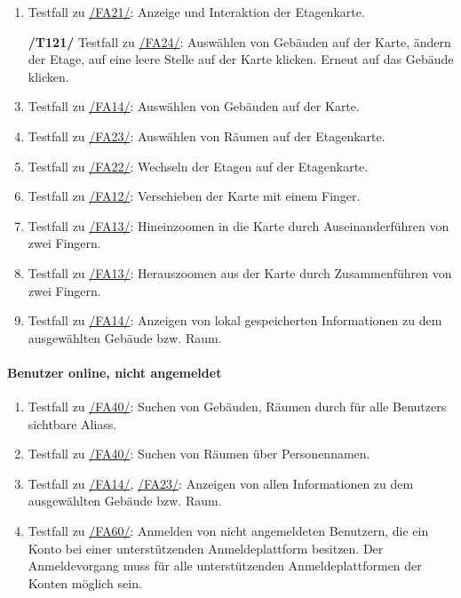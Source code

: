 \begin{enumerate}[label=\textbf{/T\arabic*0/}, align=left]
	\item \label{/T120/} Testfall zu \hyperref[/FA21/]{/FA21/}: Anzeige und Interaktion der \Gls{Etagenkarte}.
	\item[\textbf{/T121/}] \label{/T121/} Testfall zu \hyperref[/FA24/]{/FA24/}: Auswählen von Gebäuden auf der \Gls{Karte}, ändern der Etage, auf eine leere Stelle auf der \Gls{Karte} klicken. Erneut auf das Gebäude klicken.
	\item \label{/T130/} Testfall zu \hyperref[/FA14/]{/FA14/}: Auswählen von Gebäuden auf der \Gls{Karte}.
	\item \label{/T140/} Testfall zu \hyperref[/FA23/]{/FA23/}: Auswählen von Räumen auf der \Gls{Etagenkarte}.
	\item \label{/T150/} Testfall zu \hyperref[/FA22/]{/FA22/}: Wechseln der Etagen auf der \Gls{Etagenkarte}.
	\item \label{/T160/} Testfall zu \hyperref[/FA12/]{/FA12/}: Verschieben der \Gls{Karte} mit einem Finger.
	\item \label{/T170/} Testfall zu \hyperref[/FA13/]{/FA13/}: Hineinzoomen in die \Gls{Karte} durch Auseinanderführen von zwei Fingern.
	\item \label{/T180/} Testfall zu \hyperref[/FA13/]{/FA13/}: Herauszoomen aus der \Gls{Karte} durch Zusammenführen von zwei Fingern.
	\item \label{/T190/} Testfall zu \hyperref[/FA14/]{/FA14/}: Anzeigen von \gls{lokal} gespeicherten Informationen zu dem ausgewählten Gebäude bzw. Raum.
\end{enumerate}

\paragraph{\Gls{Benutzer} online, nicht angemeldet}
\begin{enumerate}[label=\textbf{/T\arabic*0/}, align=left, resume]
	\item \label{/T200/} Testfall zu \hyperref[/FA40/]{/FA40/}: Suchen von Gebäuden, Räumen durch für alle \Glspl{Benutzer} sichtbare \Glspl{Alias}.
	\item \label{/T210/} Testfall zu \hyperref[/FA40/]{/FA40/}: Suchen von Räumen über Personennamen.
	\item \label{/T220/} Testfall zu \hyperref[/FA14/]{/FA14/}, \hyperref[/FA23/]{/FA23/}: Anzeigen von allen Informationen zu dem ausgewählten Gebäude bzw. Raum.
	\item \label{/T230/} Testfall zu \hyperref[/FA60/]{/FA60/}: Anmelden von nicht angemeldeten Benutzern, die ein Konto bei einer unterstützenden Anmeldeplattform besitzen. Der Anmeldevorgang muss für alle unterstützenden Anmeldeplattformen der Konten möglich sein.
\end{enumerate}

